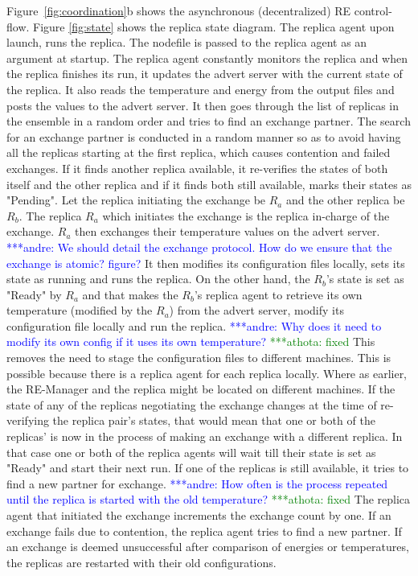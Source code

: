 \documentclass{rspublic}
\newcommand{\alnote}[1]{ {\textcolor{blue} { ***andre: #1 }}}
\newcommand{\athotanote}[1]{ {\textcolor{green} { ***athota: #1 }}}
\newcommand{\alnote}[1]{}
\newcommand{\athotanote}[1]{}
\begin{document}
Figure~\ref{fig:coordination}b shows the asynchronous (decentralized) RE
control-flow. Figure \ref{fig:state} shows the replica state diagram. The replica agent upon launch, runs the replica. The nodefile is passed to the replica agent as an argument at startup. The replica agent constantly monitors the replica and when the replica finishes its run, it updates the advert server with
the current state of the replica. It also reads the temperature and
energy from the output files and posts the values to the advert
server. It then goes through the list of replicas in the ensemble in a random order and tries to find an
exchange partner. The search for an exchange partner is conducted in a random manner so as to avoid having all the replicas starting at the first replica, which causes contention and failed exchanges. If it finds another replica available, it
re-verifies the states of both itself and the other replica and if it
finds both still available, marks their states as "Pending". Let the replica initiating the exchange be $R_a$ and the other replica be $R_b$.
The replica $R_a$ which initiates the exchange is the replica in-charge of the exchange. $R_a$
then exchanges their temperature values on the advert server.  \alnote{We
  should detail the exchange protocol. How do we ensure that the
  exchange is atomic? figure?}  It then modifies its configuration
files locally, sets its state as running and runs the replica. On the
other hand, the $R_b$'s state is set as "Ready" by $R_a$ and that
makes the $R_b$'s replica agent to retrieve its own
temperature (modified by the $R_a$) from the advert server, modify its configuration file
locally and run the replica. \alnote{Why does it need to modify its
  own config if it uses its own temperature?} \athotanote{fixed} This removes the need to stage the configuration files to
different machines. This is possible because there is a replica agent
for each replica locally. Where as earlier, the RE-Manager and the
replica might be located on different machines. 
  If the state of any of the replicas negotiating the exchange changes at the time of re-verifying the replica pair's states, that would mean that one or both of the replicas' is now in the process of making an exchange with a different replica. In that case one or both of the replica agents will wait till their state is set as "Ready" and start their next run. If one of the replicas is still available, it tries to find a new partner for exchange.  \alnote{How often is the process repeated until the replica
  is started with the old temperature?} \athotanote{fixed}The replica agent that
initiated the exchange increments the exchange count by one.
If an exchange fails due to contention, the replica agent tries to find a new partner. If an exchange is deemed unsuccessful after comparison of energies or temperatures, the replicas are restarted with their old configurations. 
\end{document}
